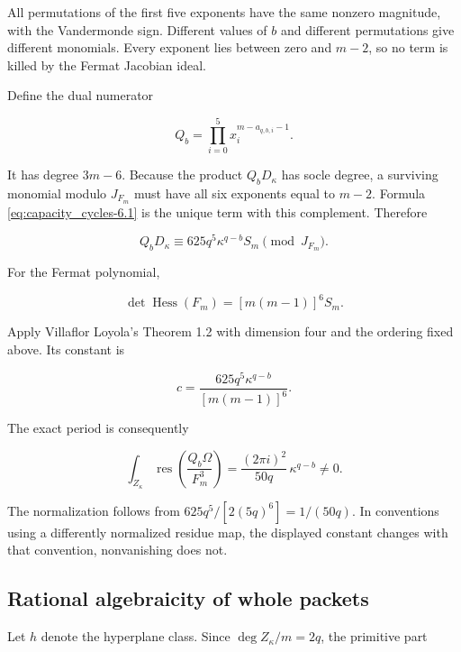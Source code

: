 All permutations of the first five exponents have the same nonzero
magnitude, with the Vandermonde sign. Different values of \(b\) and
different permutations give different monomials. Every exponent lies
between zero and \(m-2\), so no term is killed by the Fermat Jacobian
ideal.

Define the dual numerator

\begin{equation}\label{eq:capacity_cycles-6.3}
Q_b=\prod_{i=0}^5x_i^{m-a_{q,b,i}-1}.\end{equation}

It has degree \(3m-6\). Because the product \(Q_bD_\kappa\) has socle
degree, a surviving monomial modulo \(J_{F_m}\) must have all six
exponents equal to \(m-2\). Formula \eqref{eq:capacity_cycles-6.1} is the unique term with this
complement. Therefore

\begin{equation}\label{eq:capacity_cycles-6.4}
Q_bD_\kappa\equiv625q^5\kappa^{q-b}S_m\pmod{J_{F_m}}.\end{equation}

For the Fermat polynomial,

\[
\det\operatorname{Hess}(F_m)=[m(m-1)]^6S_m.
\]

Apply Villaflor Loyola's Theorem 1.2 with dimension four and the
ordering fixed above. Its constant is

\[
c=\frac{625q^5\kappa^{q-b}}{[m(m-1)]^6}.
\]

The exact period is consequently

\begin{equation}\label{eq:capacity_cycles-6.5}
\boxed{
\int_{Z_\kappa}\operatorname{res}\left(\frac{Q_b\Omega}{F_m^3}\right)
=\frac{(2\pi i)^2}{50q}\,\kappa^{q-b}\ne0.
}\end{equation}

The normalization follows from \(625q^5/[2(5q)^6]=1/(50q)\). In
conventions using a differently normalized residue map, the displayed
constant changes with that convention, nonvanishing does not.

\hypertarget{capacity_cycles-rational-algebraicity-of-whole-packets}{%
\subsection{Rational algebraicity of whole
packets}\label{capacity_cycles-rational-algebraicity-of-whole-packets}}

Let \(h\) denote the hyperplane class. Since \(\deg Z_\kappa/m=2q\), the
primitive part

